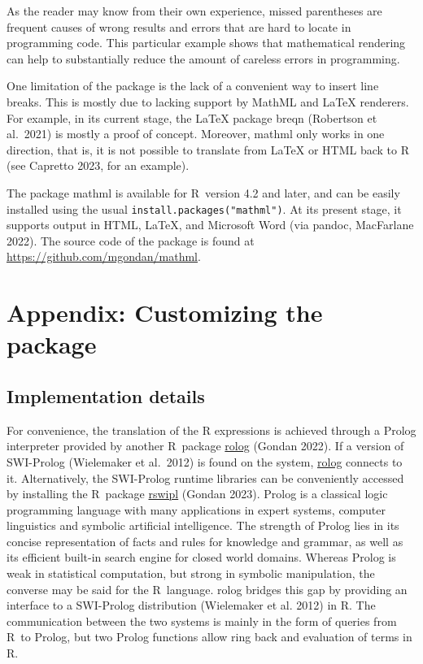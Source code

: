 As the reader may know from their own experience, missed parentheses are
frequent causes of wrong results and errors that are hard to locate in
programming code. This particular example shows that mathematical
rendering can help to substantially reduce the amount of careless errors
in programming.

One limitation of the package is the lack of a convenient way to insert
line breaks. This is mostly due to lacking support by MathML and LaTeX
renderers. For example, in its current stage, the LaTeX package breqn
(Robertson et al.~2021) is mostly a proof of concept. Moreover, mathml
only works in one direction, that is, it is not possible to translate
from LaTeX or HTML back to R (see Capretto 2023, for an example).

The package mathml is available for R~version 4.2 and later, and can be
easily installed using the usual \texttt{install.packages("mathml")}. At its
present stage, it supports output in HTML, LaTeX, and Microsoft Word
(via pandoc, MacFarlane 2022). The source code of the package is found
at \url{https://github.com/mgondan/mathml}.

\hypertarget{appendix-customizing-the-package}{%
\section{Appendix: Customizing the package}\label{appendix-customizing-the-package}}

\hypertarget{implementation-details}{%
\subsection{Implementation details}\label{implementation-details}}

For convenience, the translation of the R expressions is achieved
through a Prolog interpreter provided by another R~package
\href{https://CRAN.R-project.org/package=rolog}{rolog} (Gondan 2022). If a
version of SWI-Prolog (Wielemaker et al.~2012) is found on the system,
\href{https://CRAN.R-project.org/package=rolog}{rolog} connects to it.
Alternatively, the SWI-Prolog runtime libraries can be conveniently
accessed by installing the R~package
\href{https://CRAN.R-project.org/package=rswipl}{rswipl} (Gondan 2023).
Prolog is a classical logic programming language with many applications
in expert systems, computer linguistics and symbolic artificial
intelligence. The strength of Prolog lies in its concise representation
of facts and rules for knowledge and grammar, as well as its efficient
built-in search engine for closed world domains. Whereas Prolog is weak
in statistical computation, but strong in symbolic manipulation, the
converse may be said for the R~language. rolog bridges this gap by
providing an interface to a SWI-Prolog distribution (Wielemaker et al.
2012) in R. The communication between the two systems is mainly in the
form of queries from R~to Prolog, but two Prolog functions allow ring
back and evaluation of terms in R.

